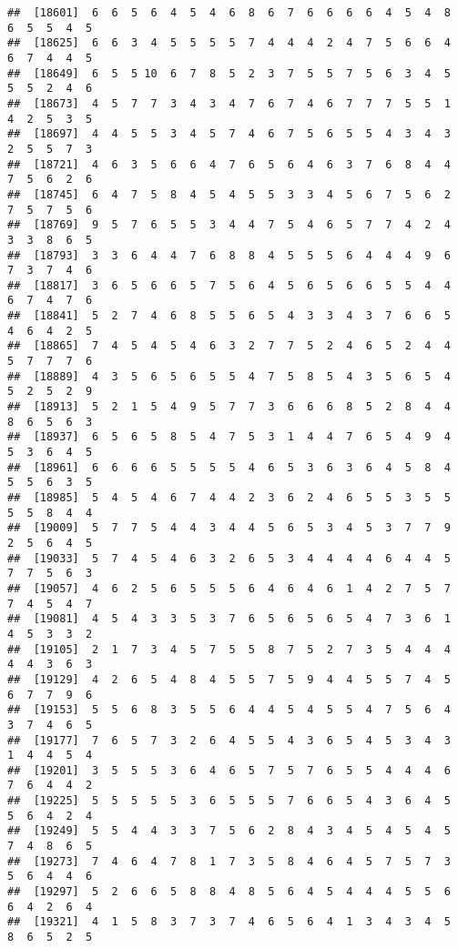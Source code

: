 \documentclass[
]{book}
\begin{document}
\begin{verbatim}
##  [18601]  6  6  5  6  4  5  4  6  8  6  7  6  6  6  6  4  5  4  8  6  5  5  4  5
##  [18625]  6  6  3  4  5  5  5  5  7  4  4  4  2  4  7  5  6  6  4  6  7  4  4  5
##  [18649]  6  5  5 10  6  7  8  5  2  3  7  5  5  7  5  6  3  4  5  5  5  2  4  6
##  [18673]  4  5  7  7  3  4  3  4  7  6  7  4  6  7  7  7  5  5  1  4  2  5  3  5
##  [18697]  4  4  5  5  3  4  5  7  4  6  7  5  6  5  5  4  3  4  3  2  5  5  7  3
##  [18721]  4  6  3  5  6  6  4  7  6  5  6  4  6  3  7  6  8  4  4  7  5  6  2  6
##  [18745]  6  4  7  5  8  4  5  4  5  5  3  3  4  5  6  7  5  6  2  7  5  7  5  6
##  [18769]  9  5  7  6  5  5  3  4  4  7  5  4  6  5  7  7  4  2  4  3  3  8  6  5
##  [18793]  3  3  6  4  4  7  6  8  8  4  5  5  5  6  4  4  4  9  6  7  3  7  4  6
##  [18817]  3  6  5  6  6  5  7  5  6  4  5  6  5  6  6  5  5  4  4  6  7  4  7  6
##  [18841]  5  2  7  4  6  8  5  5  6  5  4  3  3  4  3  7  6  6  5  4  6  4  2  5
##  [18865]  7  4  5  4  5  4  6  3  2  7  7  5  2  4  6  5  2  4  4  5  7  7  7  6
##  [18889]  4  3  5  6  5  6  5  5  4  7  5  8  5  4  3  5  6  5  4  5  2  5  2  9
##  [18913]  5  2  1  5  4  9  5  7  7  3  6  6  6  8  5  2  8  4  4  8  6  5  6  3
##  [18937]  6  5  6  5  8  5  4  7  5  3  1  4  4  7  6  5  4  9  4  5  3  6  4  5
##  [18961]  6  6  6  6  5  5  5  5  4  6  5  3  6  3  6  4  5  8  4  5  5  6  3  5
##  [18985]  5  4  5  4  6  7  4  4  2  3  6  2  4  6  5  5  3  5  5  5  5  8  4  4
##  [19009]  5  7  7  5  4  4  3  4  4  5  6  5  3  4  5  3  7  7  9  2  5  6  4  5
##  [19033]  5  7  4  5  4  6  3  2  6  5  3  4  4  4  4  6  4  4  5  7  7  5  6  3
##  [19057]  4  6  2  5  6  5  5  5  6  4  6  4  6  1  4  2  7  5  7  7  4  5  4  7
##  [19081]  4  5  4  3  3  5  3  7  6  5  6  5  6  5  4  7  3  6  1  4  5  3  3  2
##  [19105]  2  1  7  3  4  5  7  5  5  8  7  5  2  7  3  5  4  4  4  4  4  3  6  3
##  [19129]  4  2  6  5  4  8  4  5  5  7  5  9  4  4  5  5  7  4  5  6  7  7  9  6
##  [19153]  5  5  6  8  3  5  5  6  4  4  5  4  5  5  4  7  5  6  4  3  7  4  6  5
##  [19177]  7  6  5  7  3  2  6  4  5  5  4  3  6  5  4  5  3  4  3  1  4  4  5  4
##  [19201]  3  5  5  5  3  6  4  6  5  7  5  7  6  5  5  4  4  4  6  7  6  4  4  2
##  [19225]  5  5  5  5  5  3  6  5  5  5  7  6  6  5  4  3  6  4  5  5  6  4  2  4
##  [19249]  5  5  4  4  3  3  7  5  6  2  8  4  3  4  5  4  5  4  5  7  4  8  6  5
##  [19273]  7  4  6  4  7  8  1  7  3  5  8  4  6  4  5  7  5  7  3  5  6  4  4  6
##  [19297]  5  2  6  6  5  8  8  4  8  5  6  4  5  4  4  4  5  5  6  6  4  2  6  4
##  [19321]  4  1  5  8  3  7  3  7  4  6  5  6  4  1  3  4  3  4  5  8  6  5  2  5

\end{verbatim}
\end{document}
